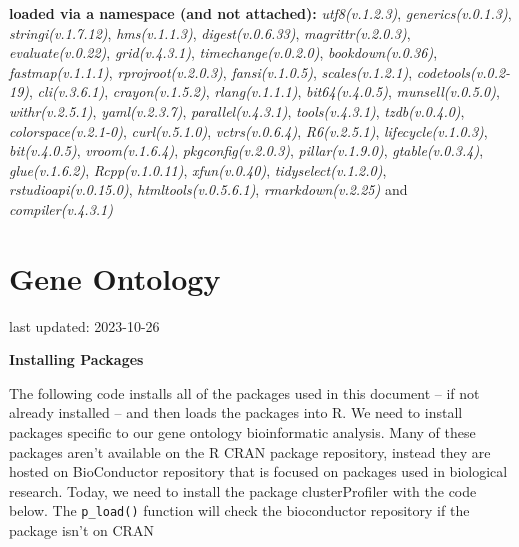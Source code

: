 \documentclass[
]{book}
\begin{document}
\textbf{loaded via a namespace (and not attached):}
\emph{utf8(v.1.2.3)}, \emph{generics(v.0.1.3)}, \emph{stringi(v.1.7.12)}, \emph{hms(v.1.1.3)}, \emph{digest(v.0.6.33)}, \emph{magrittr(v.2.0.3)}, \emph{evaluate(v.0.22)}, \emph{grid(v.4.3.1)}, \emph{timechange(v.0.2.0)}, \emph{bookdown(v.0.36)}, \emph{fastmap(v.1.1.1)}, \emph{rprojroot(v.2.0.3)}, \emph{fansi(v.1.0.5)}, \emph{scales(v.1.2.1)}, \emph{codetools(v.0.2-19)}, \emph{cli(v.3.6.1)}, \emph{crayon(v.1.5.2)}, \emph{rlang(v.1.1.1)}, \emph{bit64(v.4.0.5)}, \emph{munsell(v.0.5.0)}, \emph{withr(v.2.5.1)}, \emph{yaml(v.2.3.7)}, \emph{parallel(v.4.3.1)}, \emph{tools(v.4.3.1)}, \emph{tzdb(v.0.4.0)}, \emph{colorspace(v.2.1-0)}, \emph{curl(v.5.1.0)}, \emph{vctrs(v.0.6.4)}, \emph{R6(v.2.5.1)}, \emph{lifecycle(v.1.0.3)}, \emph{bit(v.4.0.5)}, \emph{vroom(v.1.6.4)}, \emph{pkgconfig(v.2.0.3)}, \emph{pillar(v.1.9.0)}, \emph{gtable(v.0.3.4)}, \emph{glue(v.1.6.2)}, \emph{Rcpp(v.1.0.11)}, \emph{xfun(v.0.40)}, \emph{tidyselect(v.1.2.0)}, \emph{rstudioapi(v.0.15.0)}, \emph{htmltools(v.0.5.6.1)}, \emph{rmarkdown(v.2.25)} and \emph{compiler(v.4.3.1)}

\hypertarget{gene-ontology}{%
\chapter{Gene Ontology}\label{gene-ontology}}

last updated: 2023-10-26

\textbf{Installing Packages}

The following code installs all of the packages used in this document -- if not already installed -- and then loads the packages into R. We need to install packages specific to our gene ontology bioinformatic analysis. Many of these packages aren't available on the R CRAN package repository, instead they are hosted on BioConductor repository that is focused on packages used in biological research. Today, we need to install the package clusterProfiler with the code below. The \texttt{p\_load()} function will check the bioconductor repository if the package isn't on CRAN
\end{document}
